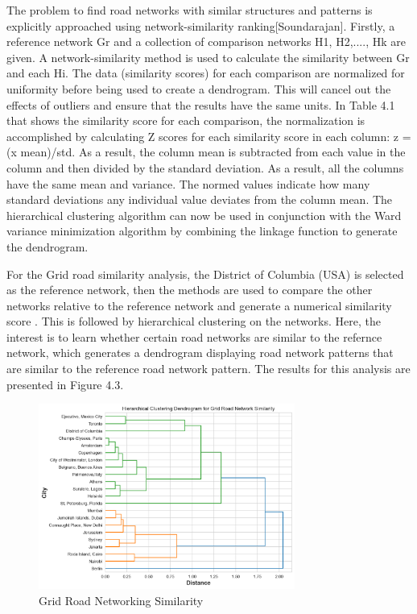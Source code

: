 The problem to find road networks with similar structures and patterns is explicitly approached using network-similarity ranking[Soundarajan]. Firstly, a reference network Gr and a collection of comparison networks H1, H2,...., Hk are given. A network-similarity method is used to calculate the similarity between Gr and each Hi. The data (similarity scores) for each comparison are normalized for uniformity before being used to create a dendrogram. This will cancel out the effects of outliers and ensure that the results have the same units. In Table 4.1 that shows the similarity score for each comparison, the normalization is accomplished by calculating Z scores for each similarity score in each column: z = (x mean)/std. As a result, the column mean is subtracted from each value in the column and then divided by the standard deviation. As a result, all the columns have the same mean and variance. The normed values indicate how many standard deviations any individual value deviates from the column mean. The hierarchical clustering algorithm can now be used in conjunction with the Ward variance minimization algorithm by combining the linkage function to generate the dendrogram. 

For the Grid road similarity analysis, the District of Columbia (USA) is selected as the reference network, then the methods are used to compare the other networks relative to the reference network and generate a numerical similarity score . This is followed by hierarchical clustering on the networks. Here, the interest is to learn whether certain road networks are similar to the refernce network, which generates a dendrogram displaying road network patterns that are similar to the reference road network pattern. The results for this analysis are presented in Figure 4.3.

\begin{figure}[!ht]
\centering
\includegraphics[width=0.75\textwidth,center]{picture/Grid/grid_dendrogram2.png}
\caption[Miniaturtrichter]{Grid Road Networking Similarity}
\label{fig:network ranking}
\end{figure}

